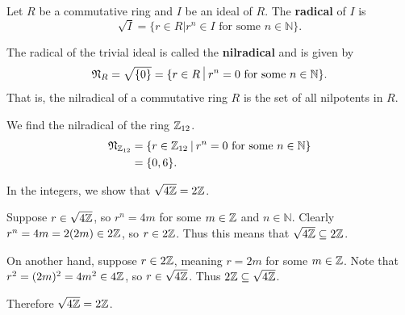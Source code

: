 \begin{definition}
    Let $R$ be a commutative ring and $I$ be an ideal of $R$. The \textbf{radical} of $I$ is
    \[
        \sqrt I = \{r \in R \vert r^n \in I \text{ for some } n \in \mathbb{N}\}.
    \]
\end{definition}
\begin{definition}
    The radical of the trivial ideal is called the \textbf{nilradical} and is given by
    \[
        \Nilr{R} = \sqrt{\{0\}} = \{r \in R \vert r^n = 0 \text{ for some } n \in \mathbb{N}\}.
    \]
    That is, the nilradical of a commutative ring $R$ is the set of all nilpotents in $R$.
\end{definition}
\begin{example}
    We find the nilradical of the ring $\mathbb{Z}_{12}$.
    \begin{align*}
        \Nilr{\Z_{12}} &= \{r \in \Z_{12} \vert r^n = 0 \text{ for some } n \in \mathbb{N}\}\\
        &= \{0, 6\}.
    \end{align*}
\end{example}
\begin{example}
    In the integers, we show that $\sqrt{4\mathbb{Z}} = 2\mathbb{Z}$.

    Suppose $r \in \sqrt{4\mathbb{Z}}$, so $r^n = 4m$ for some $m \in \mathbb{Z}$ and $n \in \mathbb{N}$. Clearly $r^n = 4m = 2(2m) \in 2\mathbb{Z}$, so $r \in 2\mathbb{Z}$. Thus this means that $\sqrt{4\mathbb{Z}} \subseteq 2\mathbb{Z}$.

    On another hand, suppose $r \in 2\mathbb{Z}$, meaning $r = 2m$ for some $m \in \mathbb{Z}$. Note that $r^2 = (2m)^2 = 4m^2 \in 4\mathbb{Z}$, so $r \in \sqrt{4\mathbb{Z}}$. Thus $2\mathbb{Z} \subseteq \sqrt{4\mathbb{Z}}$.

    Therefore $\sqrt{4\mathbb{Z}} = 2\mathbb{Z}$.
\end{example}

